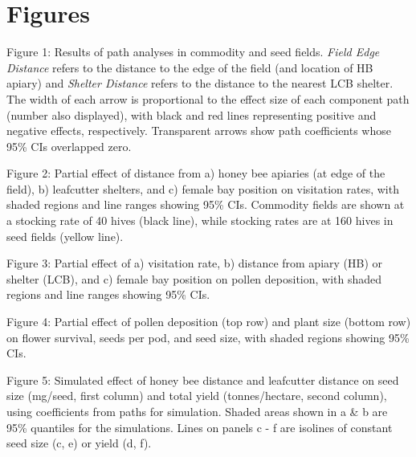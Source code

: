\documentclass[12pt]{article} %
\begin{document}
\section*{Figures}

Figure 1: Results of path analyses in commodity and seed fields. \emph{Field Edge Distance} refers to the distance to the edge of the field (and location of HB apiary) and \emph{Shelter Distance} refers to the distance to the nearest LCB shelter. The width of each arrow is proportional to the effect size of each component path (number also displayed), with black and red lines representing positive and negative effects, respectively. Transparent arrows show path coefficients whose 95\% CIs overlapped zero.

\vspace{0.5cm}

Figure 2: Partial effect of distance from a) honey bee apiaries (at edge of the field), b) leafcutter shelters, and c) female bay position on visitation rates, with shaded regions and line ranges showing 95\% CIs. Commodity fields are shown at a stocking rate of 40 hives (black line), while stocking rates are at 160 hives in seed fields (yellow line).

\vspace{0.5cm}

Figure 3: Partial effect of a) visitation rate, b) distance from apiary (HB) or shelter (LCB), and c) female bay position on pollen deposition, with shaded regions and line ranges showing 95\% CIs.

\vspace{0.5cm}

Figure 4: Partial effect of pollen deposition (top row) and plant size (bottom row) on flower survival, seeds per pod, and seed size, with shaded regions showing 95\% CIs.

\vspace{0.5cm}

Figure 5: Simulated effect of honey bee distance and leafcutter distance on seed size (mg/seed, first column) and total yield (tonnes/hectare, second column), using coefficients from paths for simulation. Shaded areas shown in a \& b are 95\% quantiles for the simulations. Lines on panels c - f are isolines of constant seed size (c, e) or yield (d, f).

\clearpage
\end{document}
